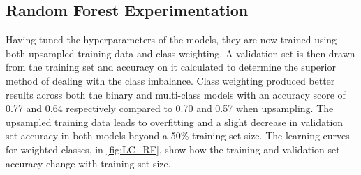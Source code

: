 \documentclass[conference]{IEEEtran}
\begin{document}
\subsection{Random Forest Experimentation}
\label{exp:rf}
Having tuned the hyperparameters of the models, they are now trained using both upsampled training data and class weighting. A validation set is then drawn from the training set and accuracy on it calculated to determine the superior method of dealing with the class imbalance. Class weighting produced better results across both the binary and multi-class models with an accuracy score of 0.77 and 0.64 respectively compared to 0.70 and 0.57 when upsampling. The upsampled training data leads to overfitting and a slight decrease in validation set accuracy in both models beyond a 50\% training set size. The learning curves for weighted classes, in \autoref{fig:LC_RF}, show how the training and validation set accuracy change with training set size.
\end{document}
